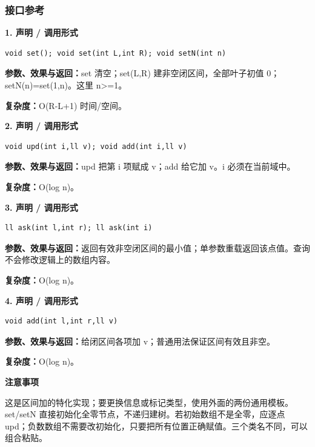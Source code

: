 \documentclass[UTF8,a4paper,10pt]{ctexart}
\newcommand{\TemplNote}[1]{\textbf{注意事项}\par #1\par}
\begin{document}
\subsubsection*{接口参考}
\noindent\begin{minipage}{\textwidth}
\textbf{1. 声明 / 调用形式}
\begin{lstlisting}
void set(); void set(int L,int R); void setN(int n)
\end{lstlisting}
\textbf{参数、效果与返回：}set 清空；set(L,R) 建非空闭区间，全部叶子初值 0；setN(n)=set(1,n)。这里 n>=1。

\textbf{复杂度：}O(R-L+1) 时间/空间。

\end{minipage}\par\vspace{0.4em}
\noindent\begin{minipage}{\textwidth}
\textbf{2. 声明 / 调用形式}
\begin{lstlisting}
void upd(int i,ll v); void add(int i,ll v)
\end{lstlisting}
\textbf{参数、效果与返回：}upd 把第 i 项赋成 v；add 给它加 v。i 必须在当前域中。

\textbf{复杂度：}O(log n)。

\end{minipage}\par\vspace{0.4em}
\noindent\begin{minipage}{\textwidth}
\textbf{3. 声明 / 调用形式}
\begin{lstlisting}
ll ask(int l,int r); ll ask(int i)
\end{lstlisting}
\textbf{参数、效果与返回：}返回有效非空闭区间的最小值；单参数重载返回该点值。查询不会修改逻辑上的数组内容。

\textbf{复杂度：}O(log n)。

\end{minipage}\par\vspace{0.4em}
\noindent\begin{minipage}{\textwidth}
\textbf{4. 声明 / 调用形式}
\begin{lstlisting}
void add(int l,int r,ll v)
\end{lstlisting}
\textbf{参数、效果与返回：}给闭区间各项加 v；普通用法保证区间有效且非空。

\textbf{复杂度：}O(log n)。

\TemplNote{这是区间加的特化实现；要更换信息或标记类型，使用外面的两份通用模板。set/setN 直接初始化全零节点，不递归建树。若初始数组不是全零，应逐点 upd；负数数组不需要改初始化，只要把所有位置正确赋值。三个类名不同，可以组合粘贴。}
\end{minipage}\par\vspace{0.4em}
\end{document}
